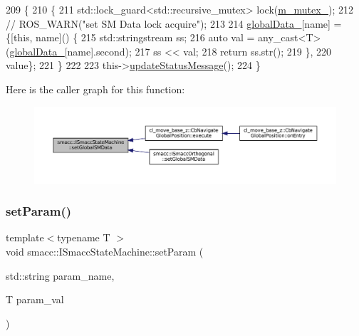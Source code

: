 \begin{DoxyCode}
209   \{
210     \{
211       std::lock\_guard<std::recursive\_mutex> lock(\hyperlink{classsmacc_1_1ISmaccStateMachine_aac785541646e5c517273bf31072505a1}{m\_mutex\_});
212       \textcolor{comment}{// ROS\_WARN("set SM Data lock acquire");}
213 
214       \hyperlink{classsmacc_1_1ISmaccStateMachine_ad2f9dae184ea942db632ac4532a10a91}{globalData\_}[name] = \{[\textcolor{keyword}{this}, name]() \{
215                              std::stringstream ss;
216                              \textcolor{keyword}{auto} val = any\_cast<T>(\hyperlink{classsmacc_1_1ISmaccStateMachine_ad2f9dae184ea942db632ac4532a10a91}{globalData\_}[name].second);
217                              ss << val;
218                              \textcolor{keywordflow}{return} ss.str();
219                            \},
220                            value\};
221     \}
222 
223     this->\hyperlink{classsmacc_1_1ISmaccStateMachine_ad246a49015fadaeb0b1639d7ab99f7d0}{updateStatusMessage}();
224   \}
\end{DoxyCode}
Here is the caller graph for this function\+:
\nopagebreak
\begin{figure}[H]
\begin{center}
\leavevmode
\includegraphics[width=350pt]{classsmacc_1_1ISmaccStateMachine_a8588f9e580fbb95b53e2bd2ca3ff1f98_icgraph}
\end{center}
\end{figure}
\mbox{\label{classsmacc_1_1ISmaccStateMachine_afc730437f45fa107292c078dfab2aa37}} 
\subsubsection{\texorpdfstring{set\+Param()}{setParam()}}
{\footnotesize\ttfamily template$<$typename T $>$ \\
void smacc\+::\+I\+Smacc\+State\+Machine\+::set\+Param (\begin{DoxyParamCaption}\item[{std\+::string}]{param\+\_\+name,  }\item[{T}]{param\+\_\+val }\end{DoxyParamCaption})\hspace{0.3cm}{\ttfamily [protected]}}



